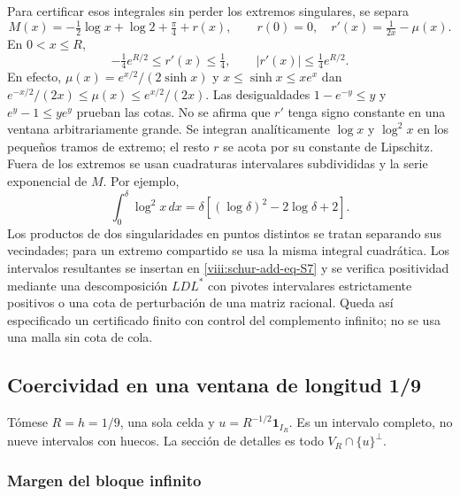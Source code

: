 Para certificar esos integrales sin perder los extremos singulares,
se separa
\begin{equation}
M(x)=-\tfrac12\log x+\log2+\tfrac\pi4+r(x),
\qquad r(0)=0,\quad r'(x)=\tfrac1{2x}-\mu(x).
\label{viii:schur-add-eq-S8}
\end{equation}
En \(0<x\leq R\),
\begin{equation}
-\tfrac14 e^{R/2}\leq r'(x)\leq\tfrac14,
\qquad |r'(x)|\leq\tfrac14e^{R/2}.
\label{viii:schur-add-display-19}
\end{equation}
En efecto, \(\mu(x)=e^{x/2}/(2\sinh x)\) y
\(x\leq\sinh x\leq xe^x\) dan
\(e^{-x/2}/(2x)\leq\mu(x)\leq e^{x/2}/(2x)\).
Las desigualdades \(1-e^{-y}\leq y\) y \(e^y-1\leq ye^y\)
prueban las cotas. No se afirma que \(r'\) tenga signo constante
en una ventana arbitrariamente grande.
Se integran analíticamente \(\log x\) y \(\log^2x\) en los pequeños
tramos de extremo; el resto \(r\) se acota por su constante de Lipschitz.
Fuera de los extremos se usan cuadraturas intervalares subdivididas y
la serie exponencial de \(M\). Por ejemplo,
\begin{equation}
\int_0^\delta\log^2x\,dx
=\delta[(\log\delta)^2-2\log\delta+2].
\label{viii:schur-add-display-20}
\end{equation}
Los productos de dos singularidades en puntos distintos se tratan
separando sus vecindades; para un extremo compartido se usa la misma
integral cuadrática. Los intervalos resultantes se insertan en \eqref{viii:schur-add-eq-S7} y
se verifica positividad mediante una descomposición \(LDL^*\) con
pivotes intervalares estrictamente positivos o una cota de perturbación
de una matriz racional. Queda así especificado un certificado finito
con control del complemento infinito; no se usa una malla sin cota de cola.

\subsection{Coercividad en una ventana de longitud 1/9}
\label{viii:schur-add-sub-248}

Tómese \(R=h=1/9\), una sola celda y \(u=R^{-1/2}\mathbf1_{I_R}\).
Es un intervalo completo, no nueve intervalos con huecos. La sección
de detalles es todo \(V_R\cap\{u\}^{\perp}\).

\subsubsection{Margen del bloque infinito}
\label{viii:schur-add-sub-254}

